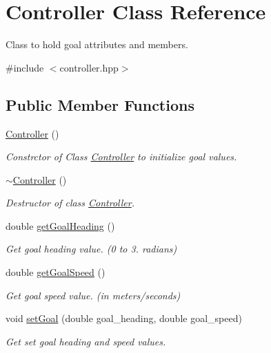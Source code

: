 \hypertarget{classController}{}\section{Controller Class Reference}
\label{classController}


Class to hold goal attributes and members.  




{\ttfamily \#include $<$controller.\+hpp$>$}

\subsection*{Public Member Functions}
\begin{DoxyCompactItemize}
\item 
\mbox{\label{classController_a95c56822d667e94b031451729ce069a9}} 
\hyperlink{classController_a95c56822d667e94b031451729ce069a9}{Controller} ()
\begin{DoxyCompactList}\small\item\em Constrctor of Class \hyperlink{classController}{Controller} to initialize goal values. \end{DoxyCompactList}\item 
\mbox{\label{classController_a0ab87934c4f7a266cfdb86e0f36bc1b5}} 
\hyperlink{classController_a0ab87934c4f7a266cfdb86e0f36bc1b5}{$\sim$\+Controller} ()
\begin{DoxyCompactList}\small\item\em Destructor of class \hyperlink{classController}{Controller}. \end{DoxyCompactList}\item 
double \hyperlink{classController_ac0aa43a79fdc74c7bd75bf383c5b80e0}{get\+Goal\+Heading} ()
\begin{DoxyCompactList}\small\item\em Get goal heading value. (0 to 3. radians) \end{DoxyCompactList}\item 
double \hyperlink{classController_ab8161275786c47cc70d1ad82f3c476e2}{get\+Goal\+Speed} ()
\begin{DoxyCompactList}\small\item\em Get goal speed value. (in meters/seconds) \end{DoxyCompactList}\item 
void \hyperlink{classController_ad41ca82c11e43a21d32c23ad159e747b}{set\+Goal} (double goal\+\_\+heading, double goal\+\_\+speed)
\begin{DoxyCompactList}\small\item\em Get set goal heading and speed values. \end{DoxyCompactList}\end{DoxyCompactItemize}


